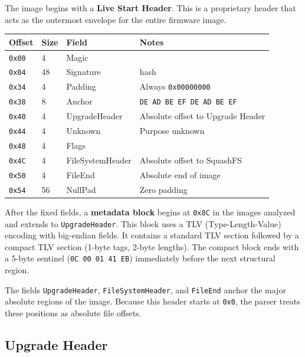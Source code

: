 \documentclass[11pt,a4paper]{article}
\begin{document}
The image begins with a \textbf{Live Start Header}. This is a proprietary
header that acts as the outermost envelope for the entire firmware image.

\begin{center}
\begin{tabular}{llll}
\toprule
\textbf{Offset} & \textbf{Size} & \textbf{Field} & \textbf{Notes} \\
\midrule
\texttt{0x00} & 4  & Magic            & \\
\texttt{0x04} & 48 & Signature        & hash \\
\texttt{0x34} & 4  & Padding          & Always \texttt{0x00000000} \\
\texttt{0x38} & 8  & Anchor           & \texttt{DE AD BE EF DE AD BE EF} \\
\texttt{0x40} & 4  & UpgradeHeader    & Absolute offset to Upgrade Header \\
\texttt{0x44} & 4  & Unknown          & Purpose unknown \\
\texttt{0x48} & 4  & Flags            & \\
\texttt{0x4C} & 4  & FileSystemHeader & Absolute offset to SquashFS \\
\texttt{0x50} & 4  & FileEnd          & Absolute end of image \\
\texttt{0x54} & 56 & NullPad          & Zero padding \\
\bottomrule
\end{tabular}
\end{center}

After the fixed fields, a \textbf{metadata block} begins at
\texttt{0x8C} in the images analyzed and extends to
\texttt{UpgradeHeader}. This block uses a
TLV (Type-Length-Value) encoding with big-endian fields. It contains a
standard TLV section followed by a compact TLV section (1-byte tags,
2-byte lengths). The compact block ends with a 5-byte sentinel
(\texttt{0C 00 01 41 EB}) immediately before the next structural region.

The fields \texttt{UpgradeHeader}, \texttt{FileSystemHeader}, and
\texttt{FileEnd} anchor the major absolute regions of the image.
Because this header starts at \texttt{0x0}, the parser treats these
positions as absolute file offsets.

\newpage
\subsection{Upgrade Header}
\end{document}
